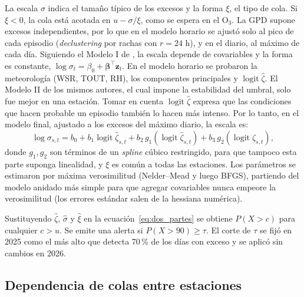 \documentclass[11pt]{article}
\begin{document}
La escala $\sigma$ indica el tamaño típico de los excesos y la forma $\xi$, el tipo de cola. Si $\xi<0$, la cola está acotada en $u-\sigma/\xi$, como se espera en el O$_3$. La GPD supone excesos independientes, por lo que en el modelo horario se ajustó solo al pico de cada episodio (\textit{declustering} por rachas con $r=24$ h), y en el diario, al máximo de cada día. Siguiendo el Modelo I de \citet{gyarmati2017}, la escala depende de covariables y la forma es constante, $\log\sigma_t=\beta_0+\boldsymbol{\beta}^{\top}\mathbf{z}_t$. En el modelo horario se probaron la meteorología (WSR, TOUT, RH), los componentes principales y $\operatorname{logit}\hat\zeta$. El Modelo II de los mismos autores, el cual impone la estabilidad del umbral, solo fue mejor en una estación. Tomar en cuenta $\operatorname{logit}\hat\zeta$ expresa que las condiciones que hacen probable un episodio también lo hacen más intenso. Por lo tanto, en el modelo final, ajustado a los excesos del máximo diario, la escala es:
\begin{equation}
\log\sigma_{s,t} = b_0 + b_1\operatorname{logit}\hat\zeta_{s,t} + b_2\,g_1(\operatorname{logit}\hat\zeta_{s,t}) + b_3\,g_2(\operatorname{logit}\hat\zeta_{s,t}),
\label{eq:gpd_final}
\end{equation}
donde $g_1, g_2$ son términos de un \textit{spline} cúbico restringido, para que tampoco esta parte suponga linealidad, y $\xi$ es común a todas las estaciones. Los parámetros se estimaron por máxima verosimilitud (Nelder--Mead y luego BFGS), partiendo del modelo anidado más simple para que agregar covariables nunca empeore la verosimilitud (los errores estándar salen de la hessiana numérica).

Sustituyendo $\hat\zeta$, $\hat\sigma$ y $\hat\xi$ en la ecuación~\eqref{eq:dos_partes} se obtiene $P(X>c)$ para cualquier $c>u$. Se emite una alerta si $P(X>90)\geq\tau$. El corte de $\tau$ se fijó en 2025 como el más alto que detecta 70\,\% de los días con exceso y se aplicó sin cambios en 2026.

\subsection{Dependencia de colas entre estaciones}
\label{sec:mod-dependencia}
\end{document}
